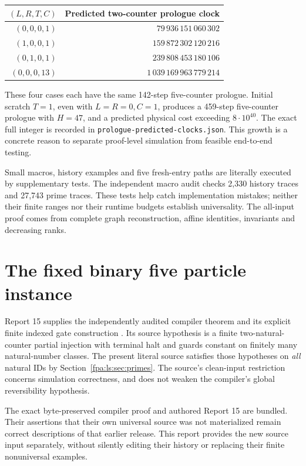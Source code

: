 \documentclass[11pt,a4paper]{article}
\numberwithin{equation}{section}
\newcommand{\code}[1]{\texttt{\small #1}}
\begin{document}
\begin{center}
\begin{tabular}{rr}\toprule
$(L,R,T,C)$ & Predicted two-counter prologue clock\\\midrule
$(0,0,0,1)$ & $79\,936\,151\,060\,302$\\
$(1,0,0,1)$ & $159\,872\,302\,120\,216$\\
$(0,1,0,1)$ & $239\,808\,453\,180\,106$\\
$(0,0,0,13)$ & $1\,039\,169\,963\,779\,214$\\\bottomrule
\end{tabular}
\end{center}
These four cases each have the same 142-step five-counter prologue. Initial
scratch $T=1$, even with $L=R=0,C=1$, produces a 459-step five-counter
prologue with $H=47$, and a predicted physical cost exceeding $8\cdot10^{40}$.
The exact full integer is recorded in \code{prologue-predicted-clocks.json}.
This growth is a concrete reason to separate proof-level simulation from
feasible end-to-end testing.

Small macros, history examples and five fresh-entry paths are literally
executed by supplementary tests. The independent macro audit checks 2,330
history traces and 27,743 prime traces. These tests help catch implementation
mistakes; neither their finite ranges nor their runtime budgets establish
universality. The all-input proof comes from complete graph reconstruction,
affine identities, invariants and decreasing ranks.
\section{The fixed binary five particle instance}\label{fpa:ls:sec:binary}
Report 15 supplies the independently audited compiler theorem and its explicit
finite indexed gate construction \cite{fpa:r15}. Its source hypothesis is a
finite two-natural-counter partial injection with terminal halt and guards
constant on finitely many natural-number classes. The present literal source
satisfies those hypotheses on \emph{all} natural IDs by
Section~\ref{fpa:ls:sec:primes}. The source's clean-input restriction concerns
simulation correctness, and does not weaken the compiler's global
reversibility hypothesis.

The exact byte-preserved compiler proof and authored Report 15 are bundled.
Their assertions that their own universal source was not materialized remain
correct descriptions of that earlier release. This report provides the new
source input separately, without silently editing their history or replacing
their finite nonuniversal examples.
\end{document}
